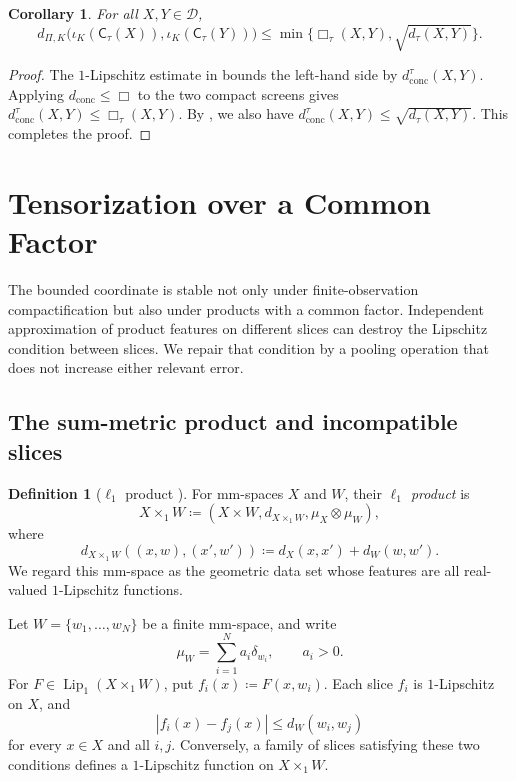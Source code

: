 \documentclass[11pt]{amsart}
\theoremstyle{plain}
\newtheorem{corollary}[theorem]{Corollary}
\theoremstyle{definition}
\newtheorem{definition}[theorem]{Definition}
\theoremstyle{remark}
\newcommand{\D}{\mathcal D}
\newcommand{\dconc}{d_{\mathrm{conc}}}
\newcommand{\dtau}{d_{\tau}}
\begin{document}
\begin{corollary}
\label{cor:tau-pyramid-comparison}
For all $X,Y\in\D$,
\[
d_{\Pi,K}\bigl(\iota_K(\mathsf C_\tau(X)),\iota_K(\mathsf C_\tau(Y))\bigr)\leq\min\{\Box_\tau(X,Y),\sqrt{\dtau(X,Y)}\}.
\]
\end{corollary}

\begin{proof}
The $1$-Lipschitz estimate in  bounds the left-hand side by $\dconc^\tau(X,Y)$. Applying $\dconc\leq\Box$ to the two compact screens gives $\dconc^\tau(X,Y)\leq\Box_\tau(X,Y)$. By , we also have $\dconc^\tau(X,Y)\leq\sqrt{\dtau(X,Y)}$. This completes the proof.
\end{proof}

\section{Tensorization over a Common Factor}
\label{sec:tensorization}

The bounded coordinate is stable not only under finite-observation compactification but also under products with a common factor. Independent approximation of product features on different slices can destroy the Lipschitz condition between slices. We repair that condition by a pooling operation that does not increase either relevant error.

\subsection{The sum-metric product and incompatible slices}
\label{subsec:l1-slice-obstacle}

\begin{definition}[$\ell_1$ product {\cite[Definition~3.66]{shioya2024sgc}}]
\label{def:l1-product}
For mm-spaces $X$ and $W$, their \emph{$\ell_1$ product} is
\[
X\times_1W\coloneqq(X\times W,d_{X\times_1W},\mu_X\otimes\mu_W),
\]
where
\[
d_{X\times_1W}((x,w),(x',w'))\coloneqq d_X(x,x')+d_W(w,w').
\]
We regard this mm-space as the geometric data set whose features are all real-valued $1$-Lipschitz functions.
\end{definition}

Let $W=\{w_1,\ldots,w_N\}$ be a finite mm-space, and write
\[
\mu_W=\sum_{i=1}^Na_i\delta_{w_i},\qquad a_i>0.
\]
For $F\in\operatorname{Lip}_1(X\times_1W)$, put $f_i(x)\coloneqq F(x,w_i)$. Each slice $f_i$ is $1$-Lipschitz on $X$, and
\[
|f_i(x)-f_j(x)|\leq d_W(w_i,w_j)
\]
for every $x\in X$ and all $i,j$. Conversely, a family of slices satisfying these two conditions defines a $1$-Lipschitz function on $X\times_1W$.
\end{document}

